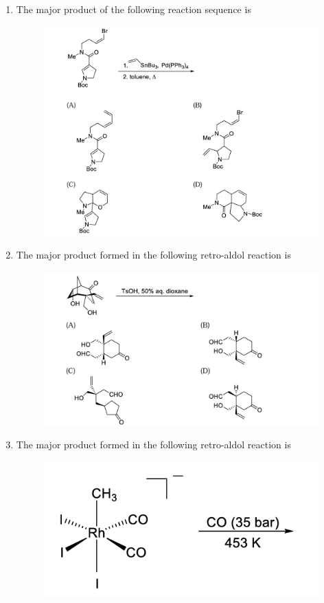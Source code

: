 \documentclass{article}
\begin{document}
\begin{enumerate}
\item The major product of the following reaction sequence is
\begin{figure}[H]
    \centering
    \includegraphics[width=1\columnwidth]{figures/cy_q31.png}
    \label{fig:placeholder}
\end{figure}

\item  The major product formed in the following retro-aldol reaction is
\begin{figure}[H]
    \centering
    \includegraphics[width=1\columnwidth]{figures/cy_q32.png}
    \label{fig:placeholder}
\end{figure}

\item The major product formed in the following retro-aldol reaction is

\begin{figure}[H]
    \includegraphics[width=0.4\columnwidth]{figures/cy_q33.png}
    \label{fig:placeholder}
\end{figure}


\end{enumerate}
\end{document}
